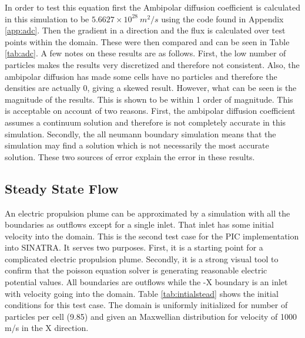\indent In order to test this equation first the Ambipolar diffusion coefficient is calculated in this simulation to be \(5.6627\times10^{28} \: m^2/s\) using the code found in Appendix \ref{app:adc}. Then the gradient in a direction and the flux is calculated over test points within the domain. These were then compared and can be seen in Table \ref{tab:adc}. A few notes on these results are as follows. First, the low number of particles makes the results very discretized and therefore not consistent. Also, the ambipolar diffusion has made some cells have no particles and therefore the densities are actually 0, giving a skewed result. However, what can be seen is the magnitude of the results. This is shown to be within 1 order of magnitude. This is acceptable on account of two reasons. First, the ambipolar diffusion coefficient assumes a continuum solution and therefore is not completely accurate in this simulation. Secondly, the all neumann boundary simulation means that the simulation may find a solution which is not necessarily the most accurate solution. These two sources of error explain the error in these results. 





\subsection{Steady State Flow}

\indent An electric propulsion plume can be approximated by a simulation with all the boundaries as outflows except for a single inlet. That inlet has some initial velocity into the domain. This is the second test case for the PIC implementation into SINATRA. It serves two purposes. First, it is a starting point for a complicated electric propulsion plume. Secondly, it is a strong visual tool to confirm that the poisson equation solver is generating reasonable electric potential values. All boundaries are outflows while the -X boundary is an inlet with velocity going into the domain. Table \ref{tab:intialstead} shows the initial conditions for this test case. The domain is uniformly initialized for number of particles per cell (9.85) and given an Maxwellian distribution for velocity of 1000 m/s in the X direction. \par



